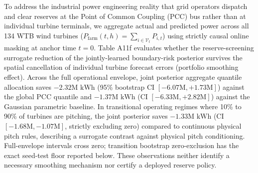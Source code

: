 \documentclass[
  journal]{IEEEtran}
\begin{document}
To address the industrial power engineering reality that grid operators
dispatch and clear reserves at the Point of Common Coupling (PCC) bus
rather than at individual turbine terminals, we aggregate actual and
predicted power across all 134 WTB wind turbines
(\(P_{\mathrm{farm}}(t, h) = \sum_{i \in \mathcal{V}_t} P_{i,t}\)) using
strictly causal online masking at anchor time \(t=0\). Table A11f
evaluates whether the reserve-screening surrogate reduction of the
jointly-learned boundary-risk posterior survives the spatial
cancellation of individual turbine forecast errors (portfolio smoothing
effect). Across the full operational envelope, joint posterior aggregate
quantile allocation saves \(-2.32\text{M kWh}\) (95\% bootstrap CI
\([-6.07\text{M}, +1.73\text{M}]\)) against the global PCC quantile and
\(-1.37\text{M kWh}\) (CI \([-6.33\text{M}, +2.82\text{M}]\)) against
the Gaussian parametric baseline. In transitional operating regimes
where 10\% to 90\% of turbines are pitching, the joint posterior saves
\(-1.33\text{M kWh}\) (CI \([-1.68\text{M}, -1.07\text{M}]\), strictly
excluding zero) compared to continuous physical pitch rules, describing
a surrogate contrast against physical pitch conditioning. Full-envelope
intervals cross zero; transition bootstrap zero-exclusion has the exact
seed-test floor reported below. These observations neither identify a
necessary smoothing mechanism nor certify a deployed reserve policy.
\end{document}
